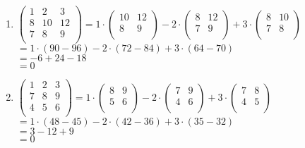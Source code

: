 \documentclass{article}
\begin{document}
\begin{enumerate}
\begin{enumerate}
    \item
    \begin{math}
    \begin{pmatrix}
    1 & 2 & 3 \\ 
    8 & 10 & 12 \\
    7 & 8 & 9 \\ 
    \end{pmatrix}
    = 1 \cdot \begin{pmatrix} 10&12 \\ 8&9 \\ \end{pmatrix} - 2 \cdot \begin{pmatrix} 8&12 \\ 7&9 \\ \end{pmatrix} + 3\cdot\begin{pmatrix} 8&10 \\ 7&8 \\ \end{pmatrix}
    \end{math}
    \\$=1\cdot (90-96)-2\cdot (72-84) +3\cdot (64-70)$
    \\$=-6+24-18$
    \\$=0$
    
    \item
    \begin{math}
    \begin{pmatrix}
    1 & 2 & 3 \\ 
    7 & 8 & 9 \\ 
    4 & 5 & 6 \\
    \end{pmatrix}
    = 1 \cdot \begin{pmatrix} 8&9 \\ 5&6\\ \end{pmatrix} - 2 \cdot \begin{pmatrix} 7&9 \\ 4 & 6\\ \end{pmatrix} + 3\cdot\begin{pmatrix} 7&8 \\ 4&5\\ \end{pmatrix}
    \end{math}
    \\$=1\cdot (48-45)-2\cdot (42-36) +3\cdot (35-32)$
    \\$=3-12+9$
    \\$=0$
    \end{enumerate}


\end{enumerate}
\end{document}
